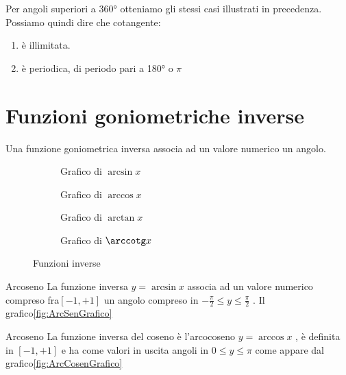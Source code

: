 Per angoli superiori a \ang{360} otteniamo gli stessi casi illustrati in precedenza. 
Possiamo quindi dire che cotangente:
\begin{enumerate}
	\item è illimitata.
	\item è periodica, di periodo pari a \ang{180} o $\pi$
\end{enumerate} 
\begin{figure}
	\centering
	
	\label{fig:AndamentoCotangente2}
\end{figure}%
\section{Funzioni goniometriche inverse}
Una funzione goniometrica inversa associa ad un valore numerico un angolo.
\begin{figure}
	\begin{subfigure}[b]{.5\linewidth}
		\centering
	
		\caption{Grafico di $\arcsin x$}\label{fig:ArcSenGrafico}
	\end{subfigure}%
	\begin{subfigure}[b]{.5\linewidth}
		\centering
	
		\caption{Grafico di $\arccos x$}\label{fig:ArcCosenGrafico}
	\end{subfigure}
		\begin{subfigure}[b]{\linewidth}
			\centering
	
		\caption{Grafico di $\arctan x$}\label{fig:ArcTangenteGrafico}
		\end{subfigure}
		\begin{subfigure}[b]{\linewidth}
		\centering
		
		\caption{Grafico di $\arccotg x$}\label{fig:ArcCotangenteGrafico}
	\end{subfigure}
			\caption{Funzioni inverse}\label{tab:funzinverse_1}
\end{figure}
\begin{definizionet}{Arcoseno}{}
	La funzione inversa $y=\arcsin x$ associa ad un valore numerico compreso fra$[-1,+1]$ un angolo compreso in  $-\frac{\pi}{2}\leq y\leq\frac{\pi}{2}$ . Il grafico\nobs\vref{fig:ArcSenGrafico} 
\end{definizionet}
\begin{definizionet}{Arcoseno}{}
	La funzione inversa del coseno è l'arcocoseno $y=\arccos x$ , è definita  in $[-1,+1]$ e ha come valori in uscita angoli in  $0\leq y\leq\pi$ come appare dal grafico\nobs\vref{fig:ArcCosenGrafico} 
\end{definizionet}
